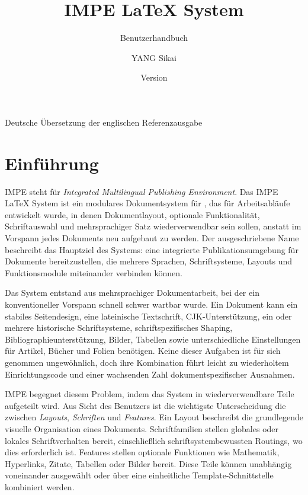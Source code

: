 \documentclass[11pt]{impeart}
\title{IMPE \LaTeX{} System}
\subtitle{Benutzerhandbuch}
\author{YANG Sikai}
\date{Version \IMPEVersion}
\begin{document}
\maketitle

\begin{center}
\small Deutsche Übersetzung der englischen Referenzausgabe
\end{center}

\tableofcontents

\section{Einführung}

IMPE steht für \emph{Integrated Multilingual Publishing Environment}.
Das IMPE \LaTeX{} System ist ein modulares Dokumentsystem für \XeLaTeX{}, das
für Arbeitsabläufe entwickelt wurde, in denen Dokumentlayout, optionale
Funktionalität, Schriftauswahl und mehrsprachiger Satz wiederverwendbar sein
sollen, anstatt im Vorspann jedes Dokuments neu aufgebaut zu werden. Der
ausgeschriebene Name beschreibt das Hauptziel des Systems: eine integrierte
Publikationsumgebung für Dokumente bereitzustellen, die mehrere Sprachen,
Schriftsysteme, Layouts und Funktionsmodule miteinander verbinden können.

Das System entstand aus mehrsprachiger Dokumentarbeit, bei der ein
konventioneller Vorspann schnell schwer wartbar wurde. Ein Dokument kann ein
stabiles Seitendesign, eine lateinische Textschrift, CJK-Unterstützung, ein oder
mehrere historische Schriftsysteme, schriftspezifisches Shaping,
Bibliographieunterstützung, Bilder, Tabellen sowie unterschiedliche
Einstellungen für Artikel, Bücher und Folien benötigen. Keine dieser Aufgaben
ist für sich genommen ungewöhnlich, doch ihre Kombination führt leicht zu
wiederholtem Einrichtungscode und einer wachsenden Zahl dokumentspezifischer
Ausnahmen.

IMPE begegnet diesem Problem, indem das System in wiederverwendbare Teile
aufgeteilt wird. Aus Sicht des Benutzers ist die wichtigste Unterscheidung die
zwischen \emph{Layouts}, \emph{Schriften} und \emph{Features}. Ein Layout
beschreibt die grundlegende visuelle Organisation eines Dokuments.
Schriftfamilien stellen globales oder lokales Schriftverhalten bereit,
einschließlich schriftsystembewussten Routings, wo dies erforderlich ist.
Features stellen optionale Funktionen wie Mathematik, Hyperlinks, Zitate,
Tabellen oder Bilder bereit. Diese Teile können unabhängig voneinander
ausgewählt oder über eine einheitliche Template-Schnittstelle kombiniert
werden.
\end{document}
